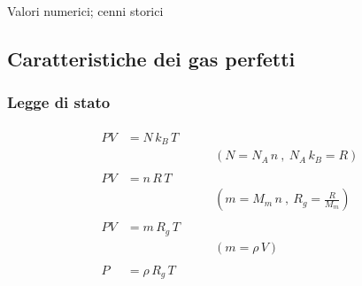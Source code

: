 \documentclass[letterpaper,10pt,italian]{jupyterBook}
\begin{document}
\sphinxAtStartPar
Valori numerici; cenni storici

\sphinxstepscope


\subsection{Caratteristiche dei gas perfetti}
\label{\detokenize{ch/thermodynamics/ideal-gas-formulas:caratteristiche-dei-gas-perfetti}}\label{\detokenize{ch/thermodynamics/ideal-gas-formulas:physics-hs-thermodynamics-matter-gases-ideal-formulas}}\label{\detokenize{ch/thermodynamics/ideal-gas-formulas::doc}}

\subsubsection{Legge di stato}
\label{\detokenize{ch/thermodynamics/ideal-gas-formulas:legge-di-stato}}\begin{equation*}
\begin{split}\begin{aligned}
  P V & =    N \, k_B \, T & \\
                           & & \qquad \text{$\left( N = N_A \, n \ , \  N_A \, k_B = R \right)$} \\ \\
  P V & =    n \, R   \, T & \\
                           & & \qquad \text{$\left( m = M_m \, n \ , \  R_g = \frac{R}{M_m} \right)$} \\ \\
  P V & =    m \, R_g \, T & \\
                           & & \qquad \text{$\left( m = \rho \, V \right)$} \\ \\
  P   & = \rho \, R_g \, T & \qquad \\
\end{aligned}\end{split}
\end{equation*}
\end{document}
